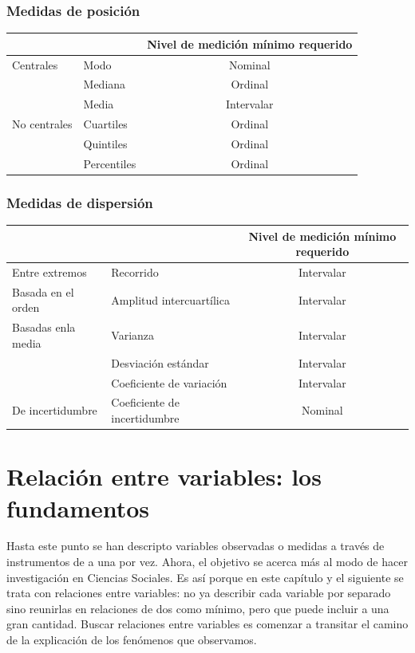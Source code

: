 \documentclass[]{book}
\begin{document}
\hypertarget{medidas-de-posiciuxf3n-1}{%
\subsection{Medidas de posición}\label{medidas-de-posiciuxf3n-1}}

\begin{longtable}[]{@{}llc@{}}
\toprule
& & Nivel de medición mínimo requerido\tabularnewline
\midrule
\endhead
Centrales & Modo & Nominal\tabularnewline
& Mediana & Ordinal\tabularnewline
& Media & Intervalar\tabularnewline
No centrales & Cuartiles & Ordinal\tabularnewline
& Quintiles & Ordinal\tabularnewline
& Percentiles & Ordinal\tabularnewline
\bottomrule
\end{longtable}

\hypertarget{medidas-de-dispersiuxf3n-1}{%
\subsection{Medidas de dispersión}\label{medidas-de-dispersiuxf3n-1}}

\begin{longtable}[]{@{}llc@{}}
\toprule
& & Nivel de medición mínimo requerido\tabularnewline
\midrule
\endhead
Entre extremos & Recorrido & Intervalar\tabularnewline
Basada en el orden & Amplitud intercuartílica & Intervalar\tabularnewline
Basadas enla media & Varianza & Intervalar\tabularnewline
& Desviación estándar & Intervalar\tabularnewline
& Coeficiente de variación & Intervalar\tabularnewline
De incertidumbre & Coeficiente de incertidumbre & Nominal\tabularnewline
\bottomrule
\end{longtable}

\hypertarget{relaciuxf3n-entre-variables-los-fundamentos}{%
\chapter{Relación entre variables: los fundamentos}\label{relaciuxf3n-entre-variables-los-fundamentos}}

Hasta este punto se han descripto variables observadas o medidas a
través de instrumentos de a una por vez. Ahora, el objetivo se acerca
más al modo de hacer investigación en Ciencias Sociales. Es así porque en este capítulo y el siguiente se trata con relaciones entre variables: no ya describir cada variable por separado sino reunirlas en
relaciones de dos como mínimo, pero que puede incluir a una gran
cantidad. Buscar relaciones entre variables es comenzar a transitar el camino de la explicación de los fenómenos que observamos.
\end{document}
